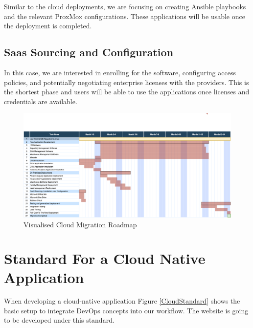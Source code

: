 \documentclass{llncs}
\begin{document}
Similar to the cloud deployments, we are focusing on creating Ansible playbooks and the relevant ProxMox configurations. These applications will be usable once the deployment is completed.

\subsection{Saas Sourcing and Configuration}

In this case, we are interested in enrolling for the software, configuring access policies, and potentially negotiating enterprise licenses with the providers. This is the shortest phase and users will be able to use the applications once licenses and credentials are available.

\begin{figure}[htbp]
    \begin{center}
        \includegraphics[width=1\textwidth]{diagrams/roadmap.png}
        \vspace{0.01\textwidth}
        \caption{Visualised Cloud Migration Roadmap}
        \label{cloud migration roadmap} %
    \end{center}
\end{figure}


\section{Standard For a Cloud Native Application}

When developing a cloud-native application Figure \ref{CloudStandard} shows the basic setup to integrate DevOps concepts into our workflow.
The website is going to be developed under this standard.\\
\end{document}
